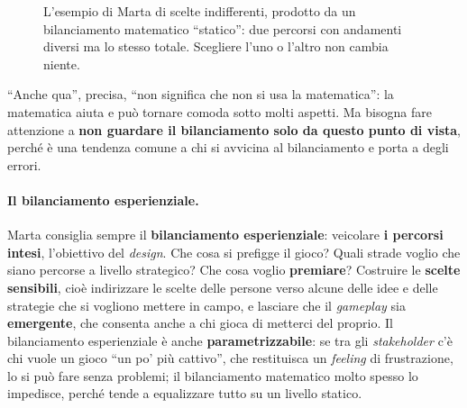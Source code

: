\begin{figure}[htbp]
\centering
{}
\caption{L'esempio di Marta di scelte indifferenti, prodotto da un bilanciamento matematico
``statico'': due percorsi con andamenti diversi ma lo stesso totale. Scegliere l'uno o
l'altro non cambia niente.}
\label{a14:fig:indifferenti}
\end{figure}

``Anche qua'', precisa, ``non significa che non si usa la matematica'': la matematica aiuta e
può tornare comoda sotto molti aspetti. Ma bisogna fare attenzione a \textbf{non guardare il
bilanciamento solo da questo punto di vista}, perché è una tendenza comune a chi si avvicina al
bilanciamento e porta a degli errori.

\paragraph{Il bilanciamento esperienziale.} Marta consiglia sempre il \textbf{bilanciamento
esperienziale}: veicolare \textbf{i percorsi intesi}, l'obiettivo del \emph{design}. Che cosa
si prefigge il gioco? Quali strade voglio che siano percorse a livello strategico? Che cosa
voglio \textbf{premiare}? Costruire le \textbf{scelte sensibili}, cioè indirizzare le scelte
delle persone verso alcune delle idee e delle strategie che si vogliono mettere in campo, e
lasciare che il \emph{gameplay} sia \textbf{emergente}, che consenta anche a chi gioca di
metterci del proprio. Il bilanciamento esperienziale è anche \textbf{parametrizzabile}: se tra
gli \emph{stakeholder} c'è chi vuole un gioco ``un po' più cattivo'', che restituisca un
\emph{feeling} di frustrazione, lo si può fare senza problemi; il bilanciamento matematico
molto spesso lo impedisce, perché tende a equalizzare tutto su un livello statico.

